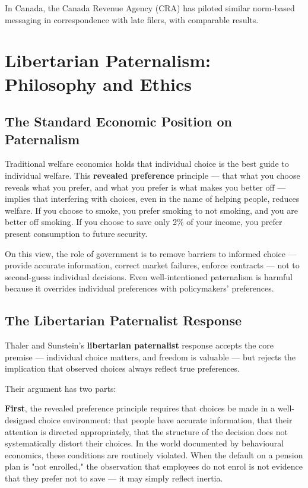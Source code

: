 \documentclass[12pt, letterpaper]{article}
\begin{document}
In Canada, the Canada Revenue Agency (CRA) has piloted similar norm-based messaging in correspondence with late filers, with comparable results.

\medskip


\section{Libertarian Paternalism: Philosophy and Ethics}



\subsection{The Standard Economic Position on Paternalism}


Traditional welfare economics holds that individual choice is the best guide to individual welfare. This \textbf{revealed preference} principle --- that what you choose reveals what you prefer, and what you prefer is what makes you better off --- implies that interfering with choices, even in the name of helping people, reduces welfare. If you choose to smoke, you prefer smoking to not smoking, and you are better off smoking. If you choose to save only 2\% of your income, you prefer present consumption to future security.

On this view, the role of government is to remove barriers to informed choice --- provide accurate information, correct market failures, enforce contracts --- not to second-guess individual decisions. Even well-intentioned paternalism is harmful because it overrides individual preferences with policymakers' preferences.


\subsection{The Libertarian Paternalist Response}


Thaler and Sunstein's \textbf{libertarian paternalist} response accepts the core premise --- individual choice matters, and freedom is valuable --- but rejects the implication that observed choices always reflect true preferences.

Their argument has two parts:

\textbf{First}, the revealed preference principle requires that choices be made in a well-designed choice environment: that people have accurate information, that their attention is directed appropriately, that the structure of the decision does not systematically distort their choices. In the world documented by behavioural economics, these conditions are routinely violated. When the default on a pension plan is "not enrolled," the observation that employees do not enrol is not evidence that they prefer not to save --- it may simply reflect inertia.
\end{document}
